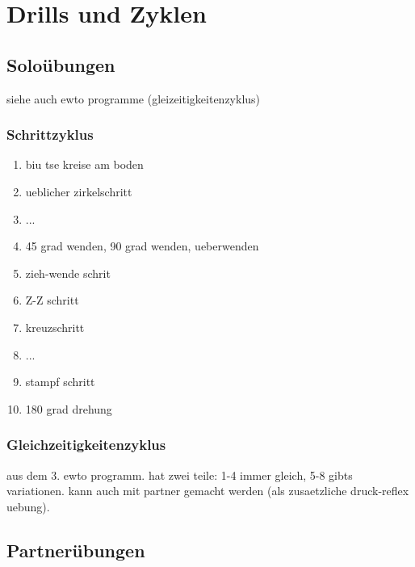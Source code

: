

\renewcommand\chapterillustration{pushing_minimalistisch}
\chapter{Drills und Zyklen}


\section{Solo\"ubungen}

siehe auch ewto programme (gleizeitigkeitenzyklus)

\subsection{Schrittzyklus}

\begin{enumerate}
	\item biu tse kreise am boden
	\item ueblicher zirkelschritt
	\item ...
	\item 45 grad wenden, 90 grad wenden, ueberwenden
	\item zieh-wende schrit
	\item Z-Z schritt
	\item kreuzschritt
	\item ...
	\item stampf schritt
	\item 180 grad drehung
\end{enumerate}

\subsection{Gleichzeitigkeitenzyklus}

aus dem 3. ewto programm.
hat zwei teile: 1-4 immer gleich, 5-8 gibts variationen.
kann auch mit partner gemacht werden (als zusaetzliche druck-reflex uebung).

\section{Partner\"ubungen}

